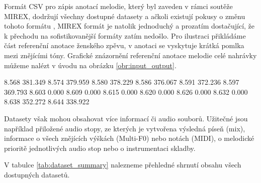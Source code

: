 Formát CSV pro zápis anotací melodie, který byl zaveden v rámci soutěže MIREX, dodržují všechny dostupné datasety a ačkoli existují pokusy o změnu tohoto formátu \citep{Humphrey2014a}, MIREX formát je natolik jednoduchý a prozatím dostačující, že k přechodu na sofistikovanější formáty zatím nedošlo. Pro ilustraci přikládáme část referenční anotace ženského zpěvu, v anotaci se vyskytuje krátká pomlka mezi znějícími tóny. Grafické znázornění referenční anotace melodie celé nahrávky můžeme nalézt v úvodu na obrázku \ref{obr:input_output}.

\begin{code}[xrightmargin=20em]

8.568     381.349
8.574     379.959
8.580     378.229
8.586     376.067
8.591     372.236
8.597     369.793
8.603     0.000
8.609     0.000
8.615     0.000
8.620     0.000
8.626     0.000
8.632     0.000
8.638     352.272
8.644     338.922

\end{code}

Datasety však mohou obsahovat více informací či audio souborů. Užitečné jsou například přiložené audio stopy, ze kterých je vytvořena výsledná píseň (mix), informace o všech znějících výškách (Multi-F0) nebo notách (MIDI), o melodické prioritě jednotlivých audio stop nebo o instrumentaci skladby.

V tabulce \ref{tab:dataset_summary} nalezneme přehledné shrnutí obsahu všech dostupných datasetů.


